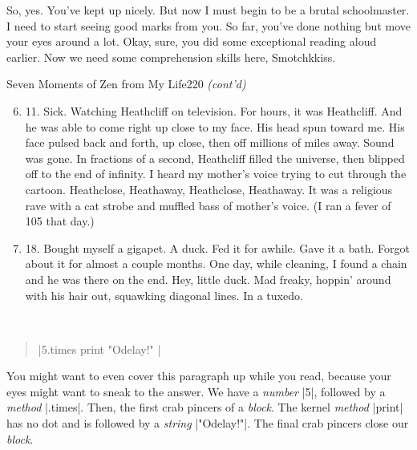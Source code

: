 \documentclass[12pt,twoside]{report}
\begin{document}
So, yes.  You've kept up nicely.  But now I must begin to be a brutal
schoolmaster. I need to start seeing good marks from you.  So far,
you've done nothing but move your eyes around a lot.  Okay, sure, you
did some exceptional reading aloud earlier.  Now we need some
comprehension skills here, Smotchkkiss.

	\begin{sidebar}{Seven Moments of Zen from My Life}{220}
		\textit{(cont'd)} \vspace{6pt}
		\begin{flushleft}
		\begin{enumerate}
			\setcounter{enumi}{5}
			\item 11. Sick. Watching Heathcliff on television. For hours, it was Heathcliff. And he was able to come right up close to my face. His head spun toward me. His face pulsed back and forth, up close, then off millions of miles away. Sound was gone. In fractions of a second, Heathcliff filled the universe, then blipped off to the end of infinity. I heard my mother's voice trying to cut through the cartoon. Heathclose, Heathaway, Heathclose, Heathaway. It was a religious rave with a cat strobe and muffled bass of mother's voice. (I ran a fever of 105 that day.)
			\item 18. Bought myself a gigapet. A duck. Fed it for awhile. Gave it a bath. Forgot about it for almost a couple months. One day, while cleaning, I found a chain and he was there on the end. Hey, little duck. Mad freaky, hoppin' around with his hair out, squawking diagonal lines. In a tuxedo.
		\end{enumerate}
		\end{flushleft}
		\vspace{6pt}
	\end{sidebar}

\ 

\begin{quote}
\rubyinline|5.times { print "Odelay!" }|\end{quote}


You might want to even cover this paragraph up while you read, because
your eyes might want to sneak to the answer.  We have a {\em number}
\rubyinline|5|, followed by a {\em method}
\rubyinline|.times|.  Then, the first crab pincers of
a {\em block}.  The kernel {\em method}
\rubyinline|print| has no dot and is followed by a
	   {\em string} \rubyinline|"Odelay!"|.  The
	   final crab pincers close our {\em block}.
\end{document}
